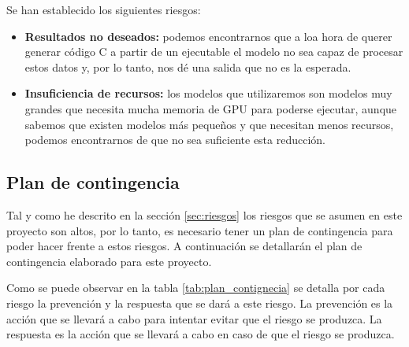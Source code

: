 Se han establecido los siguientes riesgos:

\begin{itemize}
    \item \textbf{Resultados no deseados:} podemos encontrarnos que a loa hora de querer
        generar código C a partir de un ejecutable el modelo no sea capaz de procesar estos datos
        y, por lo tanto, nos dé una salida que no es la esperada.
    \item \textbf{Insuficiencia de recursos:} los modelos que utilizaremos son modelos
        muy grandes que necesita mucha memoria de GPU para poderse ejecutar, aunque sabemos que
        existen modelos más pequeños y que necesitan menos recursos, podemos encontrarnos de
        que no sea suficiente esta reducción.
\end{itemize}

\subsection{Plan de contingencia}
\label{subsec:planContingencia}


Tal y como he descrito en la sección \ref{sec:riesgos} los riesgos que se asumen en este
proyecto son altos, por lo tanto, es necesario tener un plan de contingencia para poder
hacer frente a estos riesgos. A continuación se detallarán el plan de contingencia elaborado
para este proyecto.

Como se puede observar en la tabla \ref{tab:plan_contignecia} se detalla por cada riesgo
la prevención y la respuesta que se dará a este riesgo. La prevención es la acción que se
llevará a cabo para intentar evitar que el riesgo se produzca. La respuesta es la acción
que se llevará a cabo en caso de que el riesgo se produzca.

